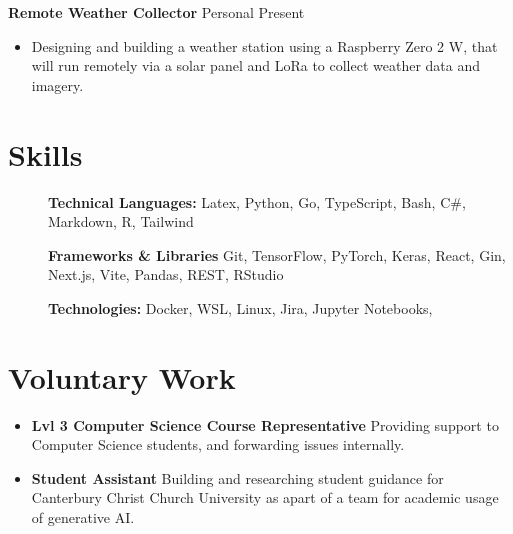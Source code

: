 \documentclass[11pt,letterpaper]{article}
\begin{document}
\textbf{Remote Weather Collector} Personal \hfill Present \\
\vspace{-10pt}
\begin{itemize}
  \item Designing and building a weather station using a Raspberry Zero 2 W, that will run remotely via a solar panel and LoRa to collect weather data and imagery.
\end{itemize}

\section*{Skills}
\begin{description}
  \item[] \textbf{Technical Languages:} Latex, Python, Go, TypeScript, Bash, C\#, Markdown, R, Tailwind
  \item[] \textbf{Frameworks \& Libraries} Git, TensorFlow, PyTorch, Keras, React, Gin, Next.js, Vite, Pandas, REST, RStudio
  \item[] \textbf{Technologies:} Docker, WSL, Linux, Jira, Jupyter Notebooks,
\end{description}

\section*{Voluntary Work}
\begin{itemize}
  \item \textbf{Lvl 3 Computer Science Course Representative} Providing support to Computer Science students, and forwarding issues internally.
  \item \textbf{Student Assistant} Building and researching student guidance for Canterbury Christ Church University as apart of a team for academic usage of generative AI.
\end{itemize}

\vspace{-16.5pt}
\end{document}
